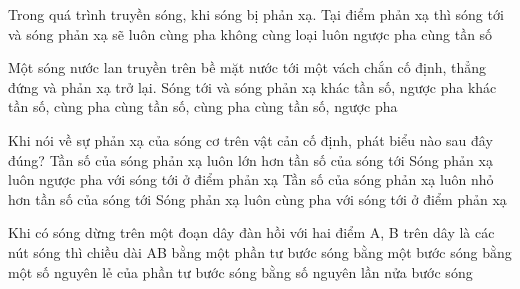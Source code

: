 \setcounter{paragraph}{0}
\setcounter{ex}{0}
\PhanI
{}
\begin{ex}%
Trong quá trình truyền sóng, khi sóng bị phản xạ. Tại điểm phản xạ thì sóng tới và sóng phản xạ sẽ
\choice
{luôn cùng pha}
{không cùng loại}
{luôn ngược pha}
{\True cùng tần số}
\end{ex} 
\begin{ex}%
Một sóng nước lan truyền trên bề mặt nước tới một vách chắn cố định, thẳng đứng và phản xạ trở lại. Sóng tới và sóng phản xạ
\choice
{khác tần số, ngược pha}
{khác tần số, cùng pha}
{cùng tần số, cùng pha}
{\True cùng tần số, ngược pha}
\end{ex} 
\begin{ex}%
Khi nói về sự phản xạ của sóng cơ trên vật cản cố định, phát biểu nào sau đây đúng?
\choice
{Tần số của sóng phản xạ luôn lớn hơn tần số của sóng tới}
{\True Sóng phản xạ luôn ngược pha với sóng tới ở điểm phản xạ}
{Tần số của sóng phản xạ luôn nhỏ hơn tần số của sóng tới}
{Sóng phản xạ luôn cùng pha với sóng tới ở điểm phản xạ}
\end{ex} 
\begin{ex}%
Khi có sóng dừng trên một đoạn dây đàn hồi với hai điểm A, B trên dây là các nút sóng thì chiều dài AB
\choice
{bằng một phần tư bước sóng}
{bằng một bước sóng}
{bằng một số nguyên lẻ của phần tư bước sóng}
{\True bằng số nguyên lần nửa bước sóng}
\end{ex} 
